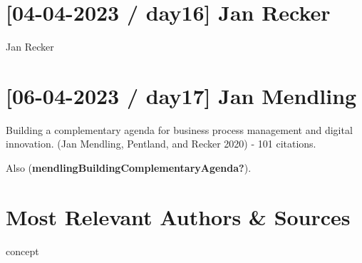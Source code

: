 \documentclass[
  letterpaper,
  DIV=11,
  numbers=noendperiod]{scrreprt}
\begin{document}
\hypertarget{day16-jan-recker}{%
\section{{[}04-04-2023 / day16{]} Jan Recker}\label{day16-jan-recker}}

Jan Recker


\hypertarget{day17-jan-mendling}{%
\section{{[}06-04-2023 / day17{]} Jan
Mendling}\label{day17-jan-mendling}}


Building a complementary agenda for business process management and
digital innovation. (Jan Mendling, Pentland, and Recker 2020) - 101
citations.

Also (\textbf{mendlingBuildingComplementaryAgenda?}).

\newpage{}

\hypertarget{most-relevant-authors-sources}{%
\section{Most Relevant Authors \&
Sources}\label{most-relevant-authors-sources}}

{concept}
\end{document}
